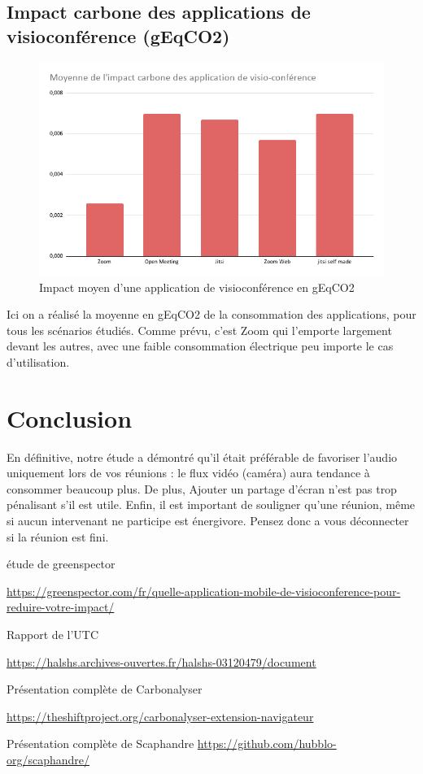 \documentclass[11pt,a4paper]{report}
\begin{document}
\newpage

\section{Impact carbone des applications de visioconférence (gEqCO2)}


\begin{figure}[!h]
    \centering
    \includegraphics[scale=0.5]{moyenne.png}
    \caption{Impact moyen d'une application de visioconférence en gEqCO2}
    \label{fig:my_label}
\end{figure}

Ici on a réalisé la moyenne en gEqCO2 de la consommation des applications, pour tous les scénarios étudiés. Comme prévu, c'est Zoom qui l'emporte largement devant les autres, avec une faible consommation électrique peu importe le cas d'utilisation.

\chapter*{Conclusion}

En définitive, notre étude a démontré qu'il était préférable de favoriser l’audio uniquement lors de vos réunions : le flux vidéo (caméra) aura tendance à consommer beaucoup plus. De plus, Ajouter un partage d’écran n’est pas trop pénalisant s’il est utile. Enfin, il est important de souligner qu'une réunion, même si aucun intervenant ne participe est énergivore. Pensez donc a vous déconnecter si la réunion est fini.


\begin{thebibliography}{9}
étude de greenspector 

\url{https://greenspector.com/fr/quelle-application-mobile-de-visioconference-pour-reduire-votre-impact/}

Rapport de l'UTC

\url{https://halshs.archives-ouvertes.fr/halshs-03120479/document}

Présentation complète de Carbonalyser

\url{https://theshiftproject.org/carbonalyser-extension-navigateur}

Présentation complète de Scaphandre
\url{https://github.com/hubblo-org/scaphandre/}

\end{thebibliography}
\end{document}
